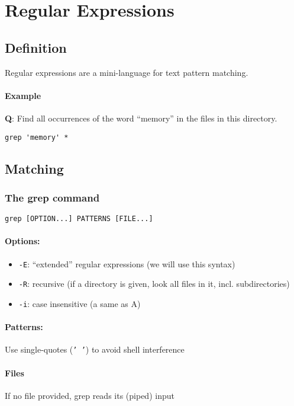 \documentclass[12pt]{article}
\begin{document}
\newpage
\section{Regular Expressions}
\subsection{Definition}
Regular expressions are a mini-language for text pattern matching.
\paragraph{Example}

\textbf{Q}: Find all occurrences of the word ``memory'' in the files in this directory.

\begin{verbatim}
grep 'memory' *
\end{verbatim}

\subsection{Matching}

\subsubsection{The grep command}

\begin{verbatim}
grep [OPTION...] PATTERNS [FILE...]
\end{verbatim}

\paragraph{Options:}
\begin{itemize}
    \item \texttt{-E}: ``extended'' regular expressions (we will use this syntax)
    \item \texttt{-R}: recursive (if a directory is given, look all files in it, incl. subdirectories)
    \item \texttt{-i}: case insensitive (a same as A)
\end{itemize}

\paragraph{Patterns:}
Use single-quotes (\texttt{' '}) to avoid shell interference

\paragraph{Files}
If no file provided, grep reads its (piped) input
\end{document}
